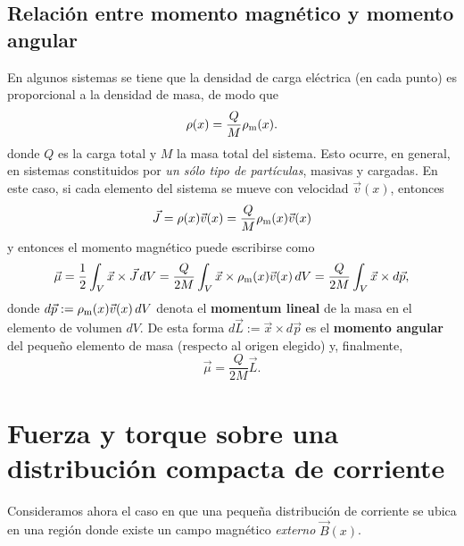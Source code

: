 \subsection{Relación entre momento magnético y momento angular}
En algunos sistemas se tiene que la densidad de carga eléctrica (en cada
punto) es proporcional a la densidad de masa, de modo que
\begin{equation}
 \rho(x)=\frac{Q}{M} \rho_{\rm m}(x).
\end{equation}
donde $Q$ es la carga total y $M$ la masa total del sistema. Esto ocurre, en
general, en sistemas constituidos por \textit{un sólo tipo de partículas},
masivas y cargadas. En este caso, si cada elemento del sistema se mueve
con velocidad $\vec{v}(x)$, entonces
\begin{equation}
\vec{J}=\rho(x)\vec{v}(x)=\frac{Q}{M} \rho_{\rm m}(x)\vec{v}(x)
\end{equation}
y entonces el momento magnético puede escribirse como
\begin{equation}
 \vec{\mu}=\frac{1}{2}\int_V \vec{x}\times\vec{J}\,dV=\frac{Q}{2M}\int_V
\vec{x}\times\rho_{\rm m}(x)\vec{v}(x)\,dV=\frac{Q}{2M}\int_V
\vec{x}\times d\vec{p},
\end{equation}
donde $d\vec{p}:=\rho_{\rm m}(x)\vec{v}(x)\,dV$ denota el \textbf{momentum lineal} de la masa en el elemento de volumen $dV$. De esta forma $d\vec{L}:=\vec{x}\times d\vec{p}$ es el \textbf{momento angular} del pequeño elemento de masa (respecto al origen elegido) y, finalmente,
\begin{equation}
 \boxed{\vec{\mu}=\frac{Q}{2M}\vec{L}.}
\end{equation}

\section{Fuerza y torque sobre una distribución compacta de corriente}
Consideramos ahora el caso en que una pequeña distribución de corriente
se ubica en una región donde existe un campo magnético \textit{externo}
$\vec{B}(x)$.

